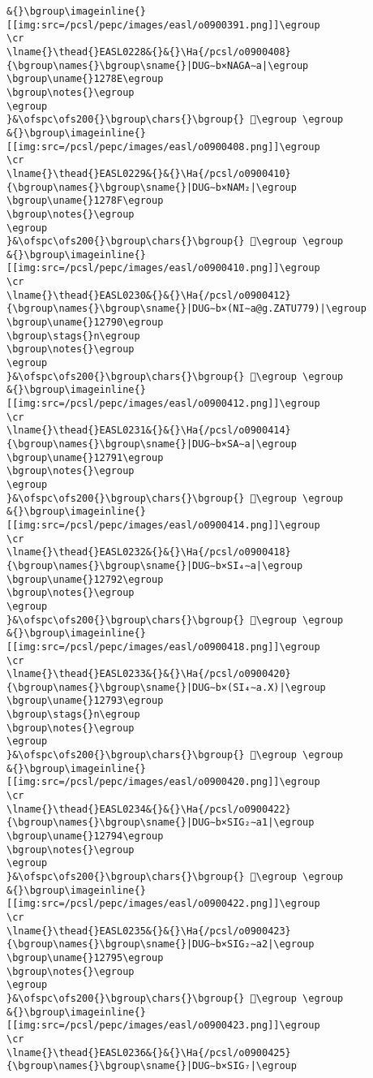 \begin{verbatim}
&{}\bgroup\imageinline{}[[img:src=/pcsl/pepc/images/easl/o0900391.png]]\egroup
\cr
\lname{}\thead{}EASL0228&{}&{}\Ha{/pcsl/o0900408}{\bgroup\names{}\bgroup\sname{}|DUG∼b×NAGA∼a|\egroup
\bgroup\uname{}1278E\egroup
\bgroup\notes{}\egroup
\egroup
}&\ofspc\ofs200{}\bgroup\chars{}\bgroup{} 𒞎\egroup \egroup
&{}\bgroup\imageinline{}[[img:src=/pcsl/pepc/images/easl/o0900408.png]]\egroup
\cr
\lname{}\thead{}EASL0229&{}&{}\Ha{/pcsl/o0900410}{\bgroup\names{}\bgroup\sname{}|DUG∼b×NAM₂|\egroup
\bgroup\uname{}1278F\egroup
\bgroup\notes{}\egroup
\egroup
}&\ofspc\ofs200{}\bgroup\chars{}\bgroup{} 𒞏\egroup \egroup
&{}\bgroup\imageinline{}[[img:src=/pcsl/pepc/images/easl/o0900410.png]]\egroup
\cr
\lname{}\thead{}EASL0230&{}&{}\Ha{/pcsl/o0900412}{\bgroup\names{}\bgroup\sname{}|DUG∼b×(NI∼a@g.ZATU779)|\egroup
\bgroup\uname{}12790\egroup
\bgroup\stags{}n\egroup
\bgroup\notes{}\egroup
\egroup
}&\ofspc\ofs200{}\bgroup\chars{}\bgroup{} 𒞐\egroup \egroup
&{}\bgroup\imageinline{}[[img:src=/pcsl/pepc/images/easl/o0900412.png]]\egroup
\cr
\lname{}\thead{}EASL0231&{}&{}\Ha{/pcsl/o0900414}{\bgroup\names{}\bgroup\sname{}|DUG∼b×SA∼a|\egroup
\bgroup\uname{}12791\egroup
\bgroup\notes{}\egroup
\egroup
}&\ofspc\ofs200{}\bgroup\chars{}\bgroup{} 𒞑\egroup \egroup
&{}\bgroup\imageinline{}[[img:src=/pcsl/pepc/images/easl/o0900414.png]]\egroup
\cr
\lname{}\thead{}EASL0232&{}&{}\Ha{/pcsl/o0900418}{\bgroup\names{}\bgroup\sname{}|DUG∼b×SI₄∼a|\egroup
\bgroup\uname{}12792\egroup
\bgroup\notes{}\egroup
\egroup
}&\ofspc\ofs200{}\bgroup\chars{}\bgroup{} 𒞒\egroup \egroup
&{}\bgroup\imageinline{}[[img:src=/pcsl/pepc/images/easl/o0900418.png]]\egroup
\cr
\lname{}\thead{}EASL0233&{}&{}\Ha{/pcsl/o0900420}{\bgroup\names{}\bgroup\sname{}|DUG∼b×(SI₄∼a.X)|\egroup
\bgroup\uname{}12793\egroup
\bgroup\stags{}n\egroup
\bgroup\notes{}\egroup
\egroup
}&\ofspc\ofs200{}\bgroup\chars{}\bgroup{} 𒞓\egroup \egroup
&{}\bgroup\imageinline{}[[img:src=/pcsl/pepc/images/easl/o0900420.png]]\egroup
\cr
\lname{}\thead{}EASL0234&{}&{}\Ha{/pcsl/o0900422}{\bgroup\names{}\bgroup\sname{}|DUG∼b×SIG₂∼a1|\egroup
\bgroup\uname{}12794\egroup
\bgroup\notes{}\egroup
\egroup
}&\ofspc\ofs200{}\bgroup\chars{}\bgroup{} 𒞔\egroup \egroup
&{}\bgroup\imageinline{}[[img:src=/pcsl/pepc/images/easl/o0900422.png]]\egroup
\cr
\lname{}\thead{}EASL0235&{}&{}\Ha{/pcsl/o0900423}{\bgroup\names{}\bgroup\sname{}|DUG∼b×SIG₂∼a2|\egroup
\bgroup\uname{}12795\egroup
\bgroup\notes{}\egroup
\egroup
}&\ofspc\ofs200{}\bgroup\chars{}\bgroup{} 𒞕\egroup \egroup
&{}\bgroup\imageinline{}[[img:src=/pcsl/pepc/images/easl/o0900423.png]]\egroup
\cr
\lname{}\thead{}EASL0236&{}&{}\Ha{/pcsl/o0900425}{\bgroup\names{}\bgroup\sname{}|DUG∼b×SIG₇|\egroup

\end{verbatim}
